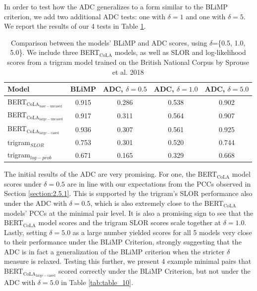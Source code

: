 In order to test how the ADC generalizes to a form similar to the BLiMP criterion, we add two additional ADC tests: one with $\delta=1$ and one with $\delta=5$.  We report the results of our 4 tests in Table \ref{tab:table_9}.



\begin{table}[h]
    \centering
    \begin{tabular}{@{}lcccc@{}}
    \toprule
    \textbf{Model} & \textbf{BLiMP} & \textbf{ADC, $\delta=0.5$} & \textbf{ADC, $\delta=1.0$} & \textbf{ADC, $\delta=5.0$}  \\
    \midrule
    BERT$_\mathrm{CoLA_{base-uncased}}$ & 0.915 & 0.286 & 0.538 & 0.902\\
    BERT$_\mathrm{CoLA_{large-uncased}}$ & 0.917 & 0.311 & 0.564 & 0.907 \\
    BERT$_\mathrm{CoLA_{large-cased}}$ & 0.936 & 0.307 & 0.561 & 0.925\\
    \midrule
    trigram$_{SLOR}$ & 0.753 & 0.301 & 0.520 & 0.744\\
    trigram$_{log-prob}$ & 0.671 & 0.165 & 0.329 & 0.668 \\
    \bottomrule
    \end{tabular}
    \caption[BERT$_\mathrm{CoLA}$ and trigram model scores under BLiMP \& ADC]{Comparison between the models' BLiMP and ADC scores, using $\delta$=\{0.5, 1.0, 5.0\}. We include three BERT$_\mathrm{CoLA}$ models, as well as SLOR and log-likelihood scores from a trigram model trained on the British National Corpus by Sprouse et al. 2018}
    \label{tab:table_9}
\end{table}

The initial results of the ADC are very promising.  For one, the BERT$_\mathrm{CoLA}$ model scores under $\delta=0.5$ are in line with our expectations from the PCCs observed in Section \ref{section:2.5.1}.  This is supported by the trigram's SLOR performance also under the ADC with $\delta=0.5$, which is also extremely close to the BERT$_\mathrm{CoLA}$ models' PCCs at the minimal pair level.  It is also a promising sign to see that the BERT$_\mathrm{CoLA}$ model scores and the trigram SLOR scores scale together at $\delta = 1.0$.  Lastly, setting $\delta=5.0$ as a large number yielded scores for all 5 models very close to their performance under the BLiMP Criterion, strongly suggesting that the ADC is in fact a generalization of the BLiMP criterion when the stricter $\delta$ measure is relaxed.  Testing this further, we present 4 example minimal pairs that BERT$_\mathrm{CoLA_{large-cased}}$ scored correctly under the BLiMP Criterion, but not under the ADC with $\delta=5.0$ in Table \ref{tab:table_10}.

